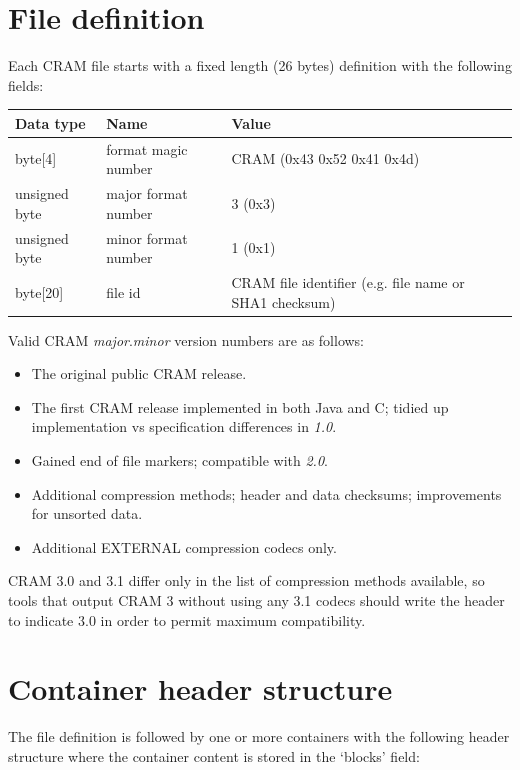 \documentclass[a4paper]{article}
\begin{document}
\section{\textbf{File definition}}

Each CRAM file starts with a fixed length (26 bytes) definition with the following 
fields:

\begin{tabular}{|l|l|l|}
\hline
\textbf{Data type} & \textbf{Name} & \textbf{Value}\tabularnewline
\hline
byte[4] & format magic number & CRAM (0x43 0x52 0x41 0x4d)\tabularnewline
\hline
unsigned byte & major format number & 3 (0x3)\tabularnewline
\hline
unsigned byte & minor format number & 1 (0x1)\tabularnewline
\hline
byte[20] & file id & CRAM file identifier (e.g. file name or SHA1 checksum)\tabularnewline
\hline
\end{tabular}

Valid CRAM \textit{major}.\textit{minor} version numbers are as follows:

\begin{itemize}
\item[\textit{1.0}]
The original public CRAM release.

\item[\textit{2.0}]
The first CRAM release implemented in both Java and C; tidied up
implementation vs specification differences in \textit{1.0}.

\item[\textit{2.1}]
Gained end of file markers; compatible with \textit{2.0}.

\item[\textit{3.0}]
Additional compression methods; header and data checksums;
improvements for unsorted data.

\item[\textit{3.1}]
Additional EXTERNAL compression codecs only.
\end {itemize}

CRAM 3.0 and 3.1 differ only in the list of compression
methods available, so tools that output CRAM 3 without using any 3.1
codecs should write the header to indicate 3.0 in order to permit
maximum compatibility.

\section{\textbf{Container header structure}}

The file definition is followed by one or more containers with the following header 
structure where the container content is stored in the `blocks' field:
\end{document}
